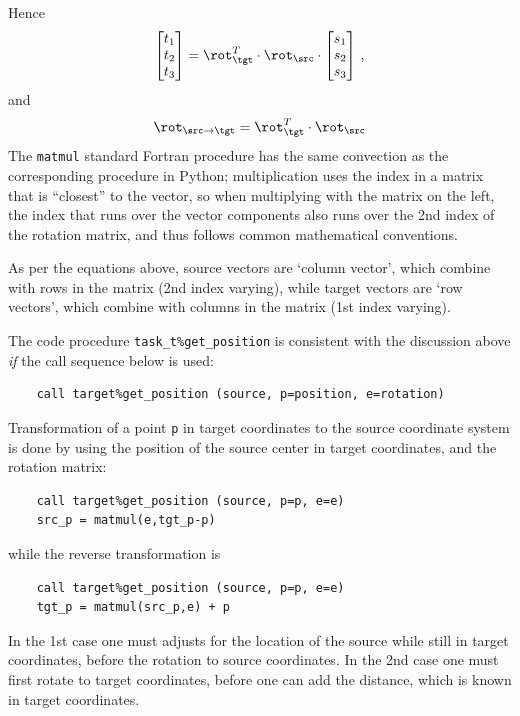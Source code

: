 \documentclass[paper=a4,fontsize=11pt]{scrartcl}
\numberwithin{equation}{section}		%
\numberwithin{figure}{section}			%
\numberwithin{table}{section}				%
\newcommand{\codecolor}{\color{Blue}}
\newcommand{\Code}[1]{{\codecolor\texttt{#1}}}
\begin{document}
Hence
\begin{equation}
    \begin{bmatrix}
    t_1 \\
    t_2 \\
    t_3
    \end{bmatrix}
    = \rot_\tgt^T \cdot \rot_\src
    \cdot
    \begin{bmatrix}
    s_1 \\
    s_2 \\
    s_3
    \end{bmatrix} \,,
\end{equation}
and
\begin{equation}
    \rot_{\src\rightarrow\tgt} = \rot_\tgt^T \cdot \rot_\src
\end{equation}
The \Code{matmul} standard Fortran procedure has the same convection as the corresponding procedure in Python; multiplication uses the index in a matrix that is ``closest'' to the vector, so when multiplying with the matrix on the left, the index that runs over the vector components also runs over the 2nd index of the rotation matrix, and thus follows common mathematical conventions.

As per the equations above, source vectors are `column vector', which combine with rows in the matrix (2nd index varying), while target vectors are `row vectors', which combine with columns in the matrix (1st index varying).

The code procedure \Code{task\_t\%get\_position} is consistent with the discussion above \textit{if} the call sequence below is used:
{\codecolor\small\begin{verbatim}
    call target%get_position (source, p=position, e=rotation)
\end{verbatim}}
Transformation of a point \Code{p} in target coordinates to the source coordinate system is done by using the position of the source center in target coordinates, and the rotation matrix:
{\codecolor\small\begin{verbatim}
    call target%get_position (source, p=p, e=e)
    src_p = matmul(e,tgt_p-p)
\end{verbatim}}
while the reverse transformation is
{\codecolor\small\begin{verbatim}
    call target%get_position (source, p=p, e=e)
    tgt_p = matmul(src_p,e) + p
\end{verbatim}}
In the 1st case one must adjusts for the location of the source while still in target coordinates, before the rotation to source coordinates.
In the 2nd case one must first rotate to target coordinates, before one can add the distance, which is known in target coordinates.
\end{document}
